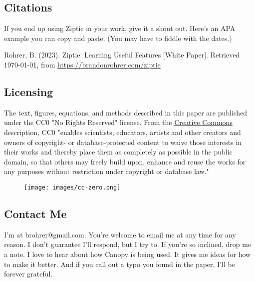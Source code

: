 \subsection{Citations}
\label{subsec:citations}

If you end up using Ziptie in your work, give it a shout out.
Here's an APA example you can copy and paste. (You may have to fiddle with
the dates.)

Rohrer, B. (2023). Ziptie: Learning Useful Features [White Paper].
Retrieved \today, from
\href{https://brandonrohrer.com/ziptie}{https://brandonrohrer.com/ziptie}


\subsection{Licensing}
\label{subsec:license}

The text, figures, equations, and methods described in this paper
are published under the CC0 "No Rights Reserved" license.
From the
\href{https://creativecommons.org/public-domain/cc0/}{Creative Commons} description,
CC0 "enables scientists, educators,
artists and other creators and owners of copyright- or database-protected
content to waive those interests in their works and thereby place them as
completely as possible in the public domain, so that others may freely
build upon, enhance and reuse the works for any purposes without restriction
under copyright or database law."

\begin{figure}[ht]
\vskip 0.2in
\begin{center}
\centerline{\texttt{[image: images/cc-zero.png]}}
\label{fig:cc0}
\end{center}
\vskip -0.2in
\end{figure}

\subsection{Contact Me}
\label{subsec:contact}

I'm at brohrer@gmail.com. You're welcome to email me at any time for
any reason. I don't guarantee I'll respond, but I try to.
If you're so inclined, drop me a note.
I love to hear about how
Canopy is being used. It gives me ideas for how to make it better.
And if you call out a typo you found in the paper, I'll be forever grateful.
